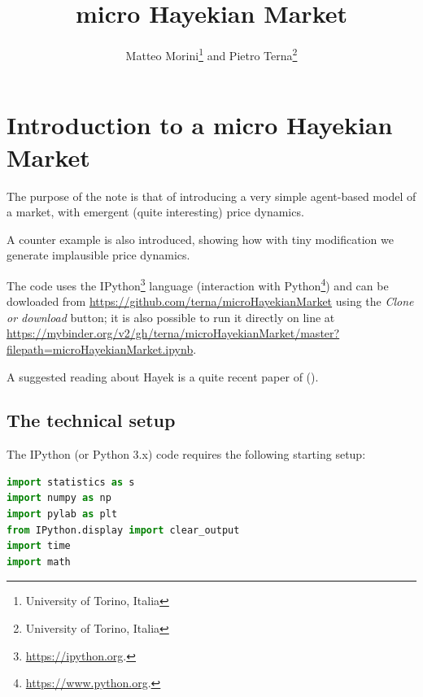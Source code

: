 \documentclass[12pt]{report}
\title{micro Hayekian Market}
\author{Matteo Morini\footnote{University of Torino, Italia} and Pietro Terna\footnote{University of Torino, Italia}}
\begin{document}
\maketitle
\thispagestyle{fancy}

\tableofcontents
\thispagestyle{fancy}

\listoffigures
\thispagestyle{fancy}


\chapter*{Introduction to a micro Hayekian Market}
\label{micro Hayekian Market}
\thispagestyle{fancy}
%


The purpose of the note is that of introducing a very simple agent-based model of a market, with emergent (quite interesting)  price dynamics.

 A counter example is also introduced, showing how with tiny modification we generate implausible price dynamics.

The code uses the IPython\footnote{\url{https://ipython.org}.} language (interaction with Python\footnote{\url{https://www.python.org}.}) and can be dowloaded from \url{https://github.com/terna/microHayekianMarket} using the \emph{Clone or download} button; it is also possible to run it directly on line at \\\url{https://mybinder.org/v2/gh/terna/microHayekianMarket/master?filepath=microHayekianMarket.ipynb}.

A suggested reading about Hayek is a quite recent paper of \citeauthor{10.1257/jep.31.3.215} (\citeyear{10.1257/jep.31.3.215}).


\section{The technical setup}\label{The technical setup}

The IPython (or Python 3.x) code requires the following starting setup:

\begin{lstlisting}[language=Python, caption=Setup of the program, basicstyle=\ttfamily\footnotesize]
%pylab inline
import statistics as s
import numpy as np
import pylab as plt
from IPython.display import clear_output
import time
import math
\end{lstlisting}
\end{document}
